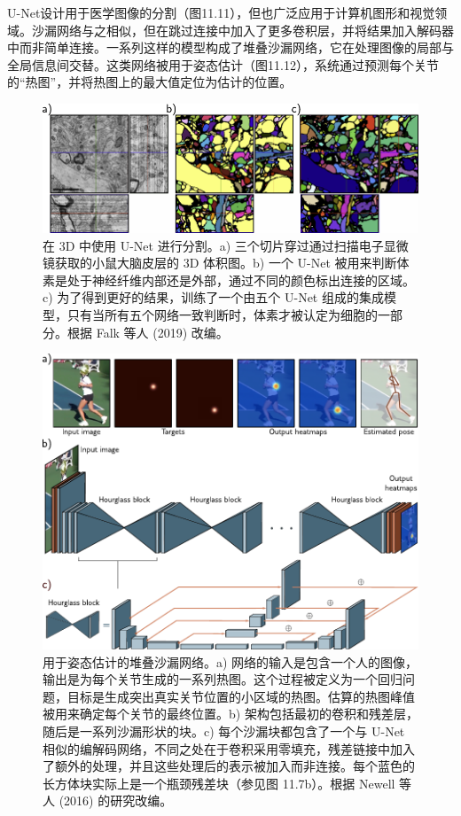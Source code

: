 \documentclass[lang=cn,newtx,10pt,scheme=chinese]{elegantbook}
\begin{document}
U-Net设计用于医学图像的分割（图11.11），但也广泛应用于计算机图形和视觉领域。沙漏网络与之相似，但在跳过连接中加入了更多卷积层，并将结果加入解码器中而非简单连接。一系列这样的模型构成了堆叠沙漏网络，它在处理图像的局部与全局信息间交替。这类网络被用于姿态估计（图11.12），系统通过预测每个关节的“热图”，并将热图上的最大值定位为估计的位置。

\begin{figure}[ht!]
\centering
\includegraphics[width=0.7\linewidth]{PDFFigures/UDLChap11PDF/ResidualUNetResults.pdf}
\caption{在 3D 中使用 U-Net 进行分割。a) 三个切片穿过通过扫描电子显微镜获取的小鼠大脑皮层的 3D 体积图。b) 一个 U-Net 被用来判断体素是处于神经纤维内部还是外部，通过不同的颜色标出连接的区域。c) 为了得到更好的结果，训练了一个由五个 U-Net 组成的集成模型，只有当所有五个网络一致判断时，体素才被认定为细胞的一部分。根据 Falk 等人 (2019) 改编。}
\end{figure}


\begin{figure}[ht!]
\centering
\includegraphics[width=0.7\linewidth]{PDFFigures/UDLChap11PDF/ResidualStackedHourglass.pdf}
\caption{用于姿态估计的堆叠沙漏网络。a) 网络的输入是包含一个人的图像，输出是为每个关节生成的一系列热图。这个过程被定义为一个回归问题，目标是生成突出真实关节位置的小区域的热图。估算的热图峰值被用来确定每个关节的最终位置。b) 架构包括最初的卷积和残差层，随后是一系列沙漏形状的块。c) 每个沙漏块都包含了一个与 U-Net 相似的编解码网络，不同之处在于卷积采用零填充，残差链接中加入了额外的处理，并且这些处理后的表示被加入而非连接。每个蓝色的长方体块实际上是一个瓶颈残差块（参见图 11.7b）。根据 Newell 等人 (2016) 的研究改编。}
\end{figure}
\end{document}
